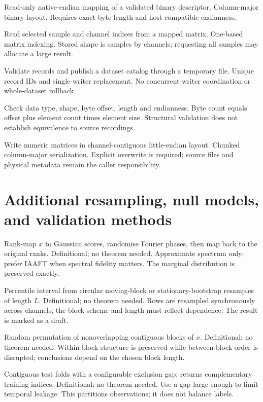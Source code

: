 {Read-only native-endian mapping of a validated binary descriptor.}
{Column-major binary layout.}
{Requires exact byte length and host-compatible endianness.}

{Read selected sample and channel indices from a mapped matrix.}
{One-based matrix indexing.}
{Stored shape is samples by channels; requesting all samples may allocate a large result.}

{Validate records and publish a dataset catalog through a temporary file.}
{Unique record IDs and single-writer replacement.}
{No concurrent-writer coordination or whole-dataset rollback.}

{Check data type, shape, byte offset, length and endianness.}
{Byte count equals offset plus element count times element size.}
{Structural validation does not establish equivalence to source recordings.}

{Write numeric matrices in channel-contiguous little-endian layout.}
{Chunked column-major serialization.}
{Explicit overwrite is required; source files and physical metadata remain the caller responsibility.}

\section{Additional resampling, null models, and validation methods}
{Rank-map $x$ to Gaussian scores, randomise Fourier phases, then map back to the original ranks.}
{Definitional; no theorem needed.}
{Approximate spectrum only; prefer IAAFT when spectral fidelity matters. The marginal distribution is preserved exactly.}

{Percentile interval from circular moving-block or stationary-bootstrap resamples of length $L$.}
{Definitional; no theorem needed.}
{Rows are resampled synchronously across channels; the block scheme and length must reflect dependence. The result is marked as a draft.}

{Random permutation of nonoverlapping contiguous blocks of $x$.}
{Definitional; no theorem needed.}
{Within-block structure is preserved while between-block order is disrupted; conclusions depend on the chosen block length.}

{Contiguous test folds with a configurable exclusion gap; returns complementary training indices.}
{Definitional; no theorem needed.}
{Use a gap large enough to limit temporal leakage. This partitions observations; it does not balance labels.}

